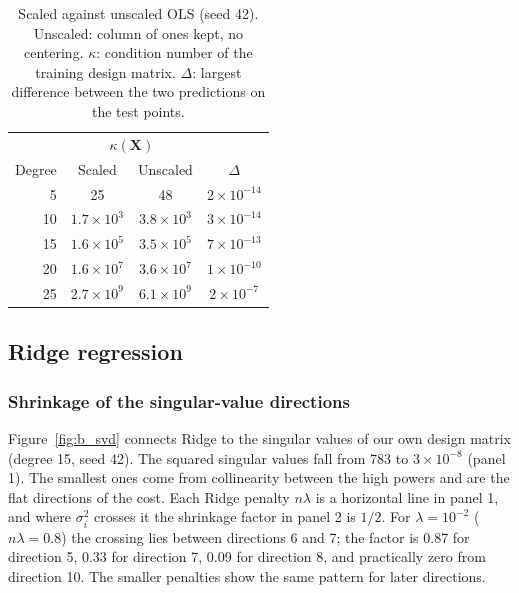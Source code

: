 \begin{table}
    \centering
    \caption{Scaled against unscaled OLS (seed 42). Unscaled: column of ones kept, no centering. $\kappa$: condition number of the training design matrix. $\Delta$: largest difference between the two predictions on the test points.}
    \label{tab:a_scaling}
    \begin{tabular}{rccc}
        \toprule
        & \multicolumn{2}{c}{$\kappa(\mathbf{X})$} & \\
        Degree & Scaled & Unscaled & $\Delta$ \\
        \midrule
        5  & 25                 & 48                 & $2\times10^{-14}$ \\
        10 & $1.7\times10^{3}$  & $3.8\times10^{3}$  & $3\times10^{-14}$ \\
        15 & $1.6\times10^{5}$  & $3.5\times10^{5}$  & $7\times10^{-13}$ \\
        20 & $1.6\times10^{7}$  & $3.6\times10^{7}$  & $1\times10^{-10}$ \\
        25 & $2.7\times10^{9}$  & $6.1\times10^{9}$  & $2\times10^{-7}$  \\
        \bottomrule
    \end{tabular}
\end{table}

\subsection{Ridge regression}\label{sec:res_ridge}

\subsubsection{Shrinkage of the singular-value directions}

Figure~\ref{fig:b_svd} connects Ridge to the singular values of our own design matrix (degree 15, seed 42). The squared singular values fall from 783 to $3\times10^{-8}$ (panel 1). The smallest ones come from collinearity between the high powers and are the flat directions of the cost. Each Ridge penalty $n\lambda$ is a horizontal line in panel 1, and where $\sigma_i^2$ crosses it the shrinkage factor in panel 2 is $1/2$. For $\lambda = 10^{-2}$ ($n\lambda = 0.8$) the crossing lies between directions 6 and 7; the factor is 0.87 for direction 5, 0.33 for direction 7, 0.09 for direction 8, and practically zero from direction 10. The smaller penalties show the same pattern for later directions.


